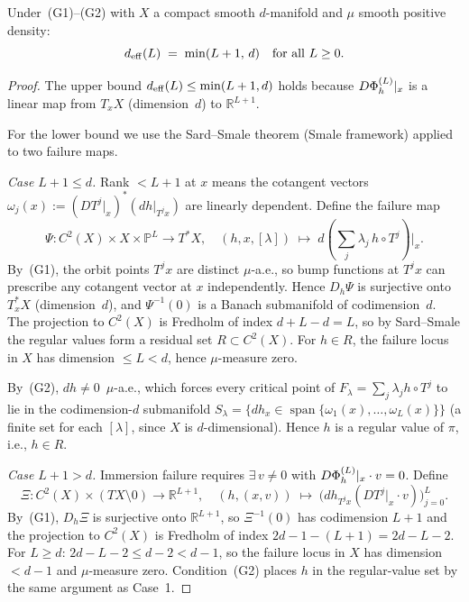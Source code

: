 \begin{lemma}
\label{lem:dimeff}
Under~(G1)--(G2) with $X$ a compact smooth $d$-manifold and $\mu$ smooth
positive density:
\[
  d_{\mathrm{eff}}(L) \;=\; \min(L+1,\, d) \quad \text{for all } L \geq 0.
\]
\end{lemma}

\begin{proof}
The upper bound $d_{\mathrm{eff}}(L) \leq \min(L+1,d)$ holds because $D\Phi_h^{(L)}|_x$ is a
linear map from $T_x X$ (dimension~$d$) to $\mathbb{R}^{L+1}$.

For the lower bound we use the Sard--Smale theorem
(Smale \cite{Takens1981} framework) applied to two failure maps.

\emph{Case $L+1 \leq d$.}
Rank $< L+1$ at $x$ means the cotangent vectors
$\omega_j(x) := (DT^j|_x)^*(dh|_{T^j x})$ are linearly dependent.
Define the failure map
\[
  \Psi : C^2(X) \times X \times \mathbb{P}^L \to T^*X,
  \quad
  (h, x, [\lambda]) \;\mapsto\; d\!\left(\textstyle\sum_j \lambda_j\, h \circ T^j\right)\bigl|_x.
\]
By~(G1), the orbit points $T^j x$ are distinct $\mu$-a.e., so bump functions
at $T^j x$ can prescribe any cotangent vector at $x$ independently.
Hence $D_h\Psi$ is surjective onto $T^*_x X$ (dimension~$d$), and
$\Psi^{-1}(0)$ is a Banach submanifold of codimension~$d$.
The projection to $C^2(X)$ is Fredholm of index $d + L - d = L$, so by
Sard--Smale the regular values form a residual set $R \subset C^2(X)$.
For $h \in R$, the failure locus in $X$ has dimension $\leq L < d$, hence
$\mu$-measure zero.

By~(G2), $dh \neq 0$~$\mu$-a.e., which forces every critical point of
$F_\lambda = \sum_j \lambda_j h \circ T^j$ to lie in the codimension-$d$
submanifold $S_\lambda = \{dh_x \in \operatorname{span}\{\omega_1(x),\ldots,\omega_L(x)\}\}$
(a finite set for each $[\lambda]$, since $X$ is $d$-dimensional).
Hence $h$ is a regular value of $\pi$, i.e., $h \in R$.

\emph{Case $L+1 > d$.}
Immersion failure requires $\exists\, v \neq 0$ with $D\Phi_h^{(L)}|_x \cdot v = 0$.
Define
\[
  \Xi : C^2(X) \times (TX \setminus 0) \to \mathbb{R}^{L+1},
  \quad
  (h,(x,v)) \;\mapsto\; \bigl(dh_{T^j x}(DT^j|_x \cdot v)\bigr)_{j=0}^L.
\]
By~(G1), $D_h\Xi$ is surjective onto $\mathbb{R}^{L+1}$, so $\Xi^{-1}(0)$
has codimension $L+1$ and the projection to $C^2(X)$ is Fredholm of index
$2d - 1 - (L+1) = 2d - L - 2$.
For $L \geq d$: $2d - L - 2 \leq d - 2 < d-1$, so the failure locus in $X$
has dimension $< d-1$ and $\mu$-measure zero.
Condition~(G2) places $h$ in the regular-value set by the same argument as
Case~1.
\end{proof}

